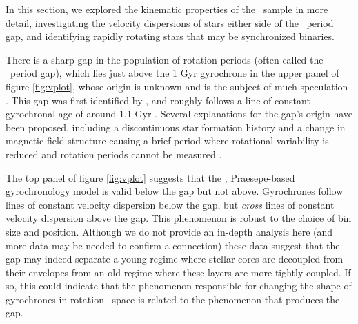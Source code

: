 In this section, we explored the kinematic properties of the \mct\ sample in
more detail, investigating the velocity dispersions of stars either side of the
\kepler\ period gap, and identifying rapidly rotating stars that may be
synchronized binaries.

There is a sharp gap in the population of rotation periods (often called the
\kepler\ period gap), which lies just above the 1 Gyr gyrochrone in the upper
panel of figure \ref{fig:vplot}, whose origin is unknown and is the subject of
much speculation \citep{mcquillan2014, davenport2018, reinhold2019}.
This gap was first identified by \mct, and roughly follows a line of constant
gyrochronal age of around 1.1 Gyr \citep[according to the][gyrochronology
relation]{angus2019}.
Several explanations for the gap's origin have been proposed, including a
discontinuous star formation history \citep{mcquillan2013, davenport2017,
davenport2018} and a change in magnetic field structure causing a brief period
where rotational variability is reduced and rotation periods cannot be
measured \citep{reinhold2019}.

The top panel of figure \ref{fig:vplot} suggests that the \citet{angus2019},
Praesepe-based gyrochronology model is valid below the gap but not above.
Gyrochrones follow lines of constant velocity dispersion below the gap, but
{\it cross} lines of constant velocity dispersion above the gap.
This phenomenon is robust to the choice of bin size and position.
Although we do not provide an in-depth analysis here (and more data may be
needed to confirm a connection) these data suggest that the gap may indeed
separate a young regime where stellar cores are decoupled from their envelopes
from an old regime where these layers are more tightly coupled.
If so, this could indicate that the phenomenon responsible for changing the
shape of gyrochrones in rotation-\teff\ space is related to the phenomenon that
produces the gap.

